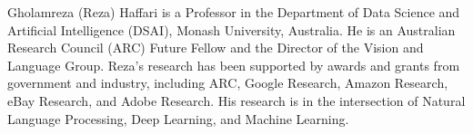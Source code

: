 Gholamreza (Reza) Haffari is a Professor in the Department of Data Science and Artificial Intelligence (DSAI), Monash University, Australia. He is an Australian Research Council (ARC) Future Fellow and the Director of the Vision and Language Group. Reza’s research has been supported by awards and grants from government and industry, including ARC, Google Research, Amazon Research, eBay Research, and Adobe Research. His research is in the intersection of Natural Language Processing, Deep Learning, and Machine Learning.
